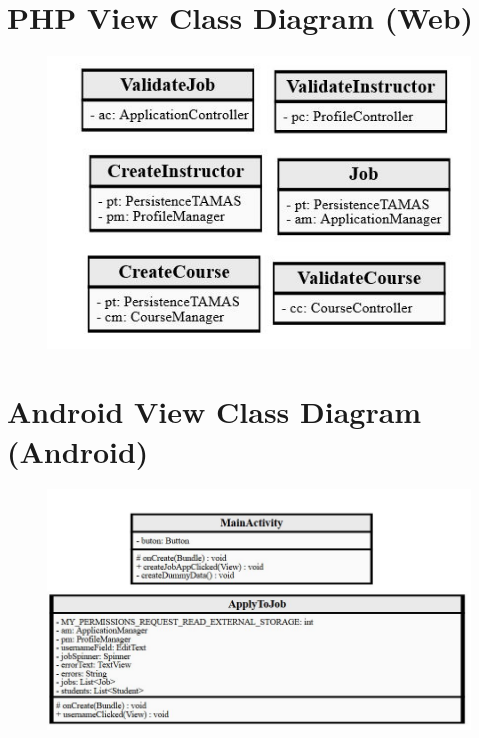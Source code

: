 \documentclass[12pt]{report}
\begin{document}
\section{PHP View Class Diagram (Web)}
\begin{figure}[H]
	\centering
	\includegraphics[]{./Design/ClassDiagrams/WebViewPackageDiagram}
\end{figure}
\section{Android View Class Diagram (Android)}
\begin{figure}[H]
	\centering
	\includegraphics[]{./Design/ClassDiagrams/AndroidViewPackageDiagram}
\end{figure}

\end{document}

